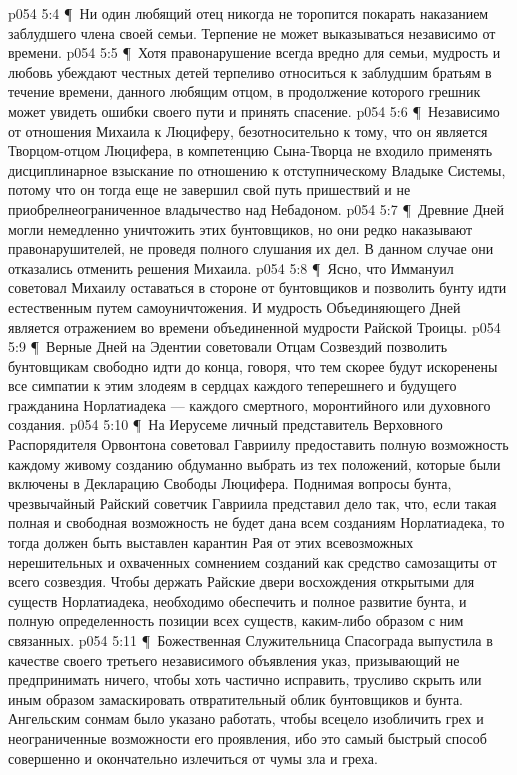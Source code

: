 \vs p054 5:4 \P\ \bibnobreakspace Ни один любящий отец никогда не торопится покарать наказанием заблудшего члена своей семьи. Терпение не может выказываться независимо от времени.
\vs p054 5:5 \P\ \bibnobreakspace Хотя правонарушение всегда вредно для семьи, мудрость и любовь убеждают честных детей терпеливо относиться к заблудшим братьям в течение времени, данного любящим отцом, в продолжение которого грешник может увидеть ошибки своего пути и принять спасение.
\vs p054 5:6 \P\ \bibnobreakspace Независимо от отношения Михаила к Люциферу, безотносительно к тому, что он является Творцом\hyp{}отцом Люцифера, в компетенцию Сына\hyp{}Творца не входило применять дисциплинарное взыскание по отношению к отступническому Владыке Системы, потому что он тогда еще не завершил свой путь пришествий и не приобрелнеограниченное владычество над Небадоном.
\vs p054 5:7 \P\ \bibnobreakspace Древние Дней могли немедленно уничтожить этих бунтовщиков, но они редко наказывают правонарушителей, не проведя полного слушания их дел. В данном случае они отказались отменить решения Михаила.
\vs p054 5:8 \P\ \bibnobreakspace Ясно, что Иммануил советовал Михаилу оставаться в стороне от бунтовщиков и позволить бунту идти естественным путем самоуничтожения. И мудрость Объединяющего Дней является отражением во времени объединенной мудрости Райской Троицы.
\vs p054 5:9 \P\ \bibnobreakspace Верные Дней на Эдентии советовали Отцам Созвездий позволить бунтовщикам свободно идти до конца, говоря, что тем скорее будут искоренены все симпатии к этим злодеям в сердцах каждого теперешнего и будущего гражданина Норлатиадека --- каждого смертного, моронтийного или духовного создания.
\vs p054 5:10 \P\ \bibnobreakspace На Иерусеме личный представитель Верховного Распорядителя Орвонтона советовал Гавриилу предоставить полную возможность каждому живому созданию обдуманно выбрать из тех положений, которые были включены в Декларацию Свободы Люцифера. Поднимая вопросы бунта, чрезвычайный Райский советчик Гавриила представил дело так, что, если такая полная и свободная возможность не будет дана всем созданиям Норлатиадека, то тогда должен быть выставлен карантин Рая от этих всевозможных нерешительных и охваченных сомнением созданий как средство самозащиты от всего созвездия. Чтобы держать Райские двери восхождения открытыми для существ Норлатиадека, необходимо обеспечить и полное развитие бунта, и полную определенность позиции всех существ, каким\hyp{}либо образом с ним связанных.
\vs p054 5:11 \P\ \bibnobreakspace Божественная Служительница Спасограда выпустила в качестве своего третьего независимого объявления указ, призывающий не предпринимать ничего, чтобы хоть частично исправить, трусливо скрыть или иным образом замаскировать отвратительный облик бунтовщиков и бунта. Ангельским сонмам было указано работать, чтобы всецело изобличить грех и неограниченные возможности его проявления, ибо это самый быстрый способ совершенно и окончательно излечиться от чумы зла и греха.
